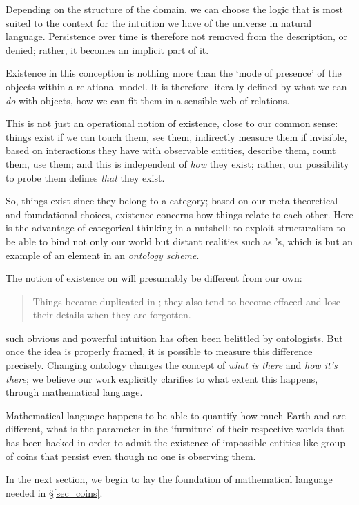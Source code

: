 Depending on the structure of the domain, we can choose the logic that is most suited to the context for the intuition we have of the universe in natural language. Persistence over time is therefore not removed from the description, or denied; rather, it becomes an implicit part of it.

Existence in this conception is nothing more than the `mode of presence' of the objects within a relational model. It is therefore literally defined by what we can \emph{do} with objects, how we can fit them in a sensible web of relations.

This is not just an operational notion of existence, close to our common sense: things exist if we can touch them, see them, indirectly measure them if invisible, based on interactions they have with observable entities, describe them, count them, use them; and this is independent of \emph{how} they exist; rather, our possibility to probe them defines \emph{that} they exist.

So, things exist since they belong to a category; based on our meta\hyp{}theoretical and foundational choices, existence concerns how things relate to each other. Here is the advantage of categorical thinking in a nutshell: to exploit structuralism to be able to bind not only our world but distant realities such as \tlon's, which is but an example of an element in an \emph{ontology scheme}.

The notion of existence on \tlon will presumably be different from our own:
\begin{quote}
    Things became duplicated in \tlon; they also tend to become effaced and lose their details when they are forgotten. \hfill\cite{Borges1963}
\end{quote}
such obvious and powerful intuition has often been belittled by ontologists. But once the idea is properly framed, it is possible to measure this difference precisely. Changing ontology changes the concept of \emph{what is there} and \emph{how it's there}; we believe our work explicitly clarifies to what extent this happens, through mathematical language.

Mathematical language happens to be able to quantify how much Earth and \tlon are different, what is the parameter in the `furniture' of their respective worlds that has been hacked in order to admit the existence of impossible entities like group of coins that persist even though no one is observing them.

In the next section, we begin to lay the foundation of mathematical language needed in §\ref{sec_coins}.